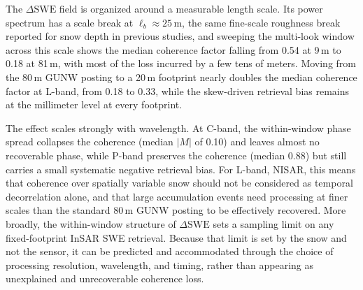 \documentclass[tc, manuscript]{copernicus}
\begin{document}
The $\Delta\mathrm{SWE}$ field is organized around a measurable length scale. Its power spectrum has a scale break at $\ell_b \approx 25$\,\unit{m}, the same fine-scale roughness break reported for snow depth in previous studies, and sweeping the multi-look window across this scale shows the median coherence factor falling from 0.54 at 9\,\unit{m} to 0.18 at 81\,\unit{m}, with most of the loss incurred by a few tens of meters. Moving from the 80\,\unit{m} GUNW posting to a 20\,\unit{m} footprint nearly doubles the median coherence factor at L-band, from 0.18 to 0.33, while the skew-driven retrieval bias remains at the millimeter level at every footprint.

The effect scales strongly with wavelength. At C-band, the within-window phase spread collapses the coherence (median $|M|$ of 0.10) and leaves almost no recoverable phase, while P-band preserves the coherence (median 0.88) but still carries a small systematic negative retrieval bias. For L-band, NISAR, this means that coherence over spatially variable snow should not be considered as temporal decorrelation alone, and that large accumulation events need processing at finer scales than the standard 80\,\unit{m} GUNW posting to be effectively recovered. More broadly, the within-window structure of $\Delta\mathrm{SWE}$ sets a sampling limit on any fixed-footprint InSAR SWE retrieval. Because that limit is set by the snow and not the sensor, it can be predicted and accommodated through the choice of processing resolution, wavelength, and timing, rather than appearing as unexplained and unrecoverable coherence loss.







\end{document}
